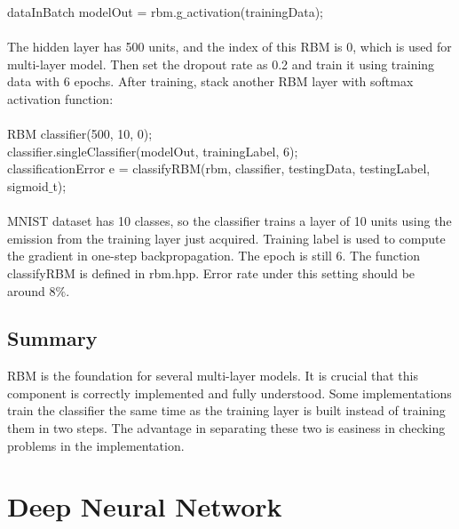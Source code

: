 \documentclass[12pt]{article}
\begin{document}
dataInBatch modelOut = rbm.g$\_$activation(trainingData);\\
\\
The hidden layer has 500 units, and the index of this RBM is 0, which is used for multi-layer model. Then set the dropout rate as 0.2 and train it using training data with 6 epochs. After training, stack another RBM layer with softmax activation function:\\
\\
RBM classifier(500, 10, 0);\\
classifier.singleClassifier(modelOut, trainingLabel, 6);\\
classificationError e = classifyRBM(rbm, classifier, testingData, testingLabel, sigmoid$\_$t);\\
\\
MNIST dataset has 10 classes, so the classifier trains a layer of 10 units using the emission from the training layer just acquired. Training label is used to compute the gradient in one-step backpropagation. The epoch is still 6. The function classifyRBM is defined in rbm.hpp. Error rate under this setting should be around 8$\%$. 
\subsection{Summary}
RBM is the foundation for several multi-layer models. It is crucial that this component is correctly implemented and fully understood. Some implementations train the classifier the same time as the training layer is built instead of training them in two steps. The advantage in separating these two is easiness in checking problems in the implementation.
\clearpage
\section{Deep Neural Network}
\end{document}
